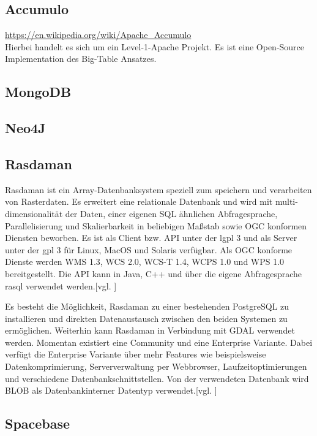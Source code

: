 \subsection{Accumulo}
\label{accumulo}
\url{https://en.wikipedia.org/wiki/Apache_Accumulo}\\
Hierbei handelt es sich um ein Level-1-Apache Projekt.%
Es ist eine Open-Source Implementation des Big-Table Ansatzes.

\subsection{MongoDB}

\subsection{Neo4J}

\newpage

\subsection{Rasdaman}

Rasdaman ist ein Array-Datenbanksystem speziell zum speichern und verarbeiten von Rasterdaten.
Es erweitert eine relationale Datenbank und wird mit  multi-dimensionalität der Daten, einer eigenen SQL ähnlichen Abfragesprache, Parallelisierung und Skalierbarkeit in beliebigen Maßstab sowie OGC konformen Diensten beworben.
Es ist als Client bzw. API unter der \Gls{lgpl} 3 und als Server unter der \Gls{gpl} 3 für Linux, MacOS und Solaris verfügbar.
Als OGC konforme Dienste werden WMS 1.3, WCS 2.0, WCS-T 1.4, WCPS 1.0 und WPS 1.0 bereitgestellt.
Die API kann in Java, C++ und über die eigene Abfragesprache rasql verwendet werden.[vgl. \cite{website:rasdamanogeo}]

Es besteht die Möglichkeit, Rasdaman zu einer bestehenden PostgreSQL zu installieren und direkten Datenaustausch zwischen den beiden Systemen zu ermöglichen.
Weiterhin kann Rasdaman in Verbindung mit GDAL verwendet werden.
Momentan existiert eine Community und eine Enterprise Variante. Dabei verfügt die Enterprise Variante über mehr Features wie beispielsweise Datenkomprimierung, Serververwaltung per Webbrowser, Laufzeitoptimierungen und verschiedene Datenbankschnittstellen.
Von der verwendeten Datenbank wird BLOB als Datenbankinterner Datentyp verwendet.[vgl. \cite{website:rasdamanowiki}]


\subsection{Spacebase}

